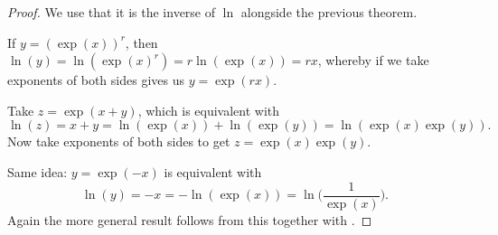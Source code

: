 \begin{proof}
	We use that it is the inverse of $\ln$ alongside the previous theorem.

	 If $y = (\exp(x))^r$, then $\ln(y) = \ln(\exp(x)^r) = r \ln(\exp(x)) = rx$, whereby if we take exponents of both sides gives us $y = \exp(r x)$.

	 Take $z = \exp(x + y)$, which is equivalent with
	\[
		\ln(z) = x + y = \ln(\exp(x)) + \ln(\exp(y)) = \ln(\exp(x) \exp(y)).
	\]
	Now take exponents of both sides to get $z = \exp(x) \exp(y)$.

	 Same idea: $y = \exp(-x)$ is equivalent with
	\[
		\ln(y) = -x = - \ln(\exp(x)) = \ln \Big ( \frac{1}{\exp(x)} \Big ).
	\]
	Again the more general result follows from this together with .
\end{proof}
